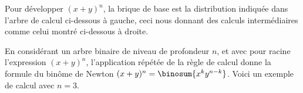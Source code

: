 Pour développer $(x + y)^n$, la brique de base est la distribution indiquée dans l'arbre de calcul ci-dessous à gauche, ceci nous donnant des calculs intermédiaires comme celui montré ci-dessous à droite.

%
            {\intertree}{}

En considérant un arbre binaire de niveau de profondeur $n$, et avec pour racine l'expression $(x + y)^n$, l'application répétée de la règle de calcul donne la formule du binôme de Newton
$(x + y)^n = \binosum{x^k y^{n-k}}$.
%
Voici un exemple de calcul avec $n=3$.

